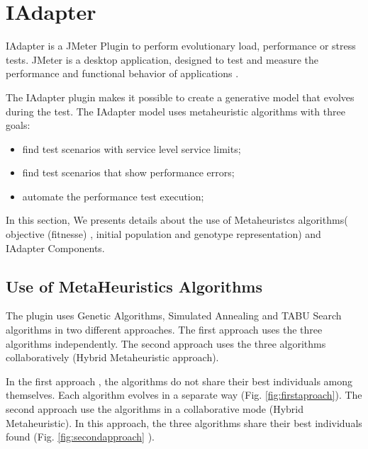\section{IAdapter}

IAdapter is a JMeter Plugin to perform evolutionary load, performance or stress tests. JMeter is a desktop application, designed to test and measure the performance and functional behavior of applications \cite{Nevedrov2007}.

The IAdapter plugin makes it possible to create a generative model that evolves during the test. The IAdapter model uses metaheuristic algorithms with three goals:

\begin{itemize}
\item find test scenarios with service level service limits;
\item find test scenarios that show performance errors;
\item automate the performance test execution;
\end{itemize}

In this section, We presents details about the use of Metaheuristcs algorithms( objective (fitnesse) , initial population and genotype representation) and IAdapter Components.

\subsection{Use of MetaHeuristics Algorithms}

The plugin uses Genetic Algorithms, Simulated Annealing and TABU Search algorithms in two different approaches. The first approach uses the three algorithms independently. The second approach uses the three algorithms collaboratively (Hybrid Metaheuristic approach).

In the first approach , the algorithms do not share their best individuals among themselves. Each algorithm evolves in a separate way (Fig. \ref{fig:firstaproach}). The second approach use the algorithms in a collaborative mode (Hybrid Metaheuristic). In this approach, the three algorithms share their best individuals found (Fig. \ref{fig:secondapproach} ).

